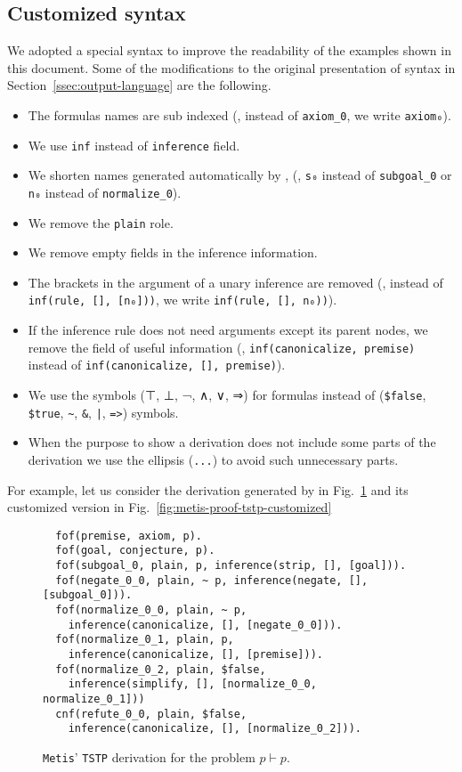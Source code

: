 \documentclass[../main.tex]{subfiles}
\begin{document}
\begin{subappendices}
\section{Customized \TSTP syntax}
\label{app:tstp-syntax}

We adopted a special \TSTP syntax to improve the readability of the \TSTP
examples shown in this document. Some of the modifications to the original
presentation of \TSTP syntax in Section~\ref{ssec:output-language} are the
following.

\begin{itemize}
  \item The formulas names are sub indexed (\eg, instead of \verb!axiom_0!,
  we write \verb!axiom₀!).
  \item We use \verb!inf! instead of \verb!inference! field.
  \item We shorten names generated automatically by \Metis, (\eg,
\verb!s₀! instead of \verb!subgoal_0! or \verb!n₀!
instead of \verb!normalize_0!).
  \item We remove the \verb!plain! role.
  \item We remove empty fields in the inference information.
  \item The brackets in the argument of a unary inference are removed (\eg,
instead of \verb!inf(rule, [], [n₀]))!, we write
\verb!inf(rule, [], n₀))!).
  \item If the inference rule does not need arguments except its parent nodes,
  we remove the field of useful information (\eg,
 \verb!inf(canonicalize, premise)! instead of
 \verb!inf(canonicalize, [], premise)!).
  \item We use the symbols (⊤, ⊥, ¬, ∧, ∨, ⇒) for formulas instead of
  (\verb!$false!, \verb!$true!, \verb!~!, \verb!&!, \verb!|!, \verb!=>!) \TPTP symbols.
  \item When the purpose to show a \TSTP derivation does not include
  some parts of the derivation we use the ellipsis (\verb!...!) to avoid
  such unnecessary parts.
\end{itemize}

For example, let us consider the \TSTP derivation generated by \Metis
in Fig.~\ref{fig:metis-proof-tstp} and its customized version in
Fig.~\ref{fig:metis-proof-tstp-customized}

\begin{figure}[!h]
\begin{verbatim}
  fof(premise, axiom, p).
  fof(goal, conjecture, p).
  fof(subgoal_0, plain, p, inference(strip, [], [goal])).
  fof(negate_0_0, plain, ~ p, inference(negate, [], [subgoal_0])).
  fof(normalize_0_0, plain, ~ p,
    inference(canonicalize, [], [negate_0_0])).
  fof(normalize_0_1, plain, p,
    inference(canonicalize, [], [premise])).
  fof(normalize_0_2, plain, $false,
    inference(simplify, [], [normalize_0_0, normalize_0_1]))
  cnf(refute_0_0, plain, $false,
    inference(canonicalize, [], [normalize_0_2])).
\end{verbatim}
\caption{\texttt{Metis}' \texttt{TSTP} derivation for the
problem $p\vdash p$.}
\label{fig:metis-proof-tstp}
\end{figure}


\end{subappendices}
\end{document}
